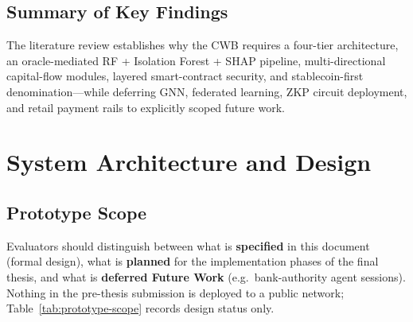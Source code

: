 \documentclass[12pt,a4paper]{report}
\begin{document}
\section{Summary of Key Findings}

The literature review establishes why the CWB requires a four-tier architecture, an oracle-mediated RF + Isolation Forest + SHAP pipeline, multi-directional capital-flow modules, layered smart-contract security, and stablecoin-first denomination---while deferring GNN, federated learning, ZKP circuit deployment, and retail payment rails to explicitly scoped future work.

\chapter{System Architecture and Design}

\section{Prototype Scope}
\label{sec:prototype-scope}

Evaluators should distinguish between what is \textbf{specified} in this document (formal design), what is \textbf{planned} for the implementation phases of the final thesis, and what is \textbf{deferred Future Work} (e.g.\ bank-authority agent sessions). Nothing in the pre-thesis submission is deployed to a public network; Table~\ref{tab:prototype-scope} records design status only.
\end{document}
